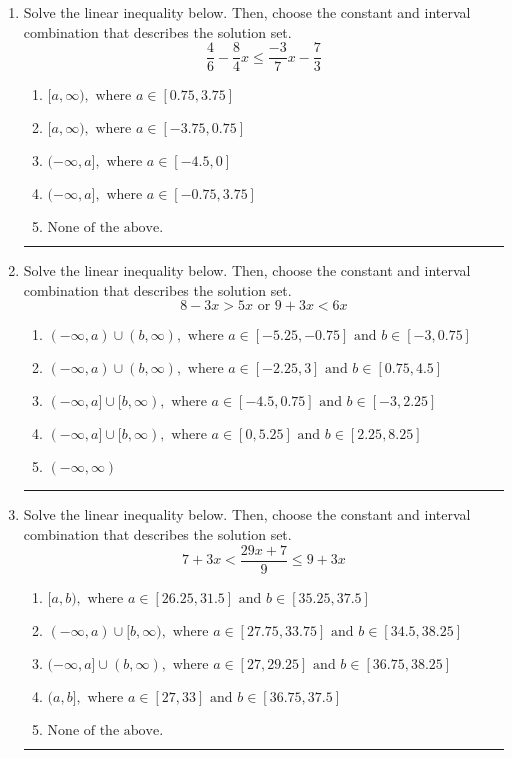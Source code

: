 \documentclass[14pt]{extbook}
\newcommand{\litem}[1]{\item#1\hspace*{-1cm}\rule{\textwidth}{0.4pt}}
\begin{document}
\begin{enumerate}
{\begin{enumerate}[label=\Alph*.]
\end{enumerate} }
\litem{
Solve the linear inequality below. Then, choose the constant and interval combination that describes the solution set.\[ \frac{4}{6} - \frac{8}{4} x \leq \frac{-3}{7} x - \frac{7}{3} \]\begin{enumerate}[label=\Alph*.]
\item \( [a, \infty), \text{ where } a \in [0.75, 3.75] \)
\item \( [a, \infty), \text{ where } a \in [-3.75, 0.75] \)
\item \( (-\infty, a], \text{ where } a \in [-4.5, 0] \)
\item \( (-\infty, a], \text{ where } a \in [-0.75, 3.75] \)
\item \( \text{None of the above}. \)

\end{enumerate} }
\litem{
Solve the linear inequality below. Then, choose the constant and interval combination that describes the solution set.\[ 8 - 3 x > 5 x \text{ or } 9 + 3 x < 6 x \]\begin{enumerate}[label=\Alph*.]
\item \( (-\infty, a) \cup (b, \infty), \text{ where } a \in [-5.25, -0.75] \text{ and } b \in [-3, 0.75] \)
\item \( (-\infty, a) \cup (b, \infty), \text{ where } a \in [-2.25, 3] \text{ and } b \in [0.75, 4.5] \)
\item \( (-\infty, a] \cup [b, \infty), \text{ where } a \in [-4.5, 0.75] \text{ and } b \in [-3, 2.25] \)
\item \( (-\infty, a] \cup [b, \infty), \text{ where } a \in [0, 5.25] \text{ and } b \in [2.25, 8.25] \)
\item \( (-\infty, \infty) \)

\end{enumerate} }
\litem{
Solve the linear inequality below. Then, choose the constant and interval combination that describes the solution set.\[ 7 + 3 x < \frac{29 x + 7}{9} \leq 9 + 3 x \]\begin{enumerate}[label=\Alph*.]
\item \( [a, b), \text{ where } a \in [26.25, 31.5] \text{ and } b \in [35.25, 37.5] \)
\item \( (-\infty, a) \cup [b, \infty), \text{ where } a \in [27.75, 33.75] \text{ and } b \in [34.5, 38.25] \)
\item \( (-\infty, a] \cup (b, \infty), \text{ where } a \in [27, 29.25] \text{ and } b \in [36.75, 38.25] \)
\item \( (a, b], \text{ where } a \in [27, 33] \text{ and } b \in [36.75, 37.5] \)
\item \( \text{None of the above.} \)

\end{enumerate} }
\end{enumerate}
\end{document}
